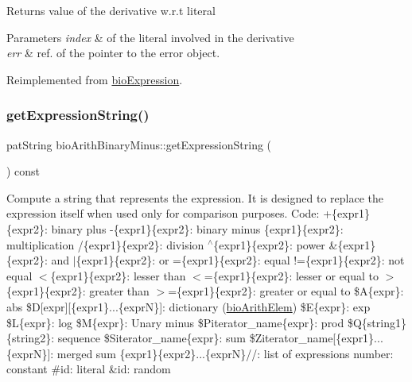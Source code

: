 \begin{DoxyReturn}{Returns}
value of the derivative w.\+r.\+t literal 
\end{DoxyReturn}

\begin{DoxyParams}{Parameters}
{\em index} & of the literal involved in the derivative \\
\hline
{\em err} & ref. of the pointer to the error object. \\
\hline
\end{DoxyParams}


Reimplemented from \hyperlink{classbio_expression_a5915579d1193f25f216c1e273c97f2ce}{bio\+Expression}.

\mbox{\label{classbio_arith_binary_minus_abfcff7ef3048216027a44af8af40471e}} 
\subsubsection{\texorpdfstring{get\+Expression\+String()}{getExpressionString()}}
{\footnotesize\ttfamily pat\+String bio\+Arith\+Binary\+Minus\+::get\+Expression\+String (\begin{DoxyParamCaption}{ }\end{DoxyParamCaption}) const\hspace{0.3cm}{\ttfamily [virtual]}}

Compute a string that represents the expression. It is designed to replace the expression itself when used only for comparison purposes. Code\+: +\{expr1\}\{expr2\}\+: binary plus -\/\{expr1\}\{expr2\}\+: binary minus \{expr1\}\{expr2\}\+: multiplication /\{expr1\}\{expr2\}\+: division $^\wedge$\{expr1\}\{expr2\}\+: power \&\{expr1\}\{expr2\}\+: and $\vert$\{expr1\}\{expr2\}\+: or =\{expr1\}\{expr2\}\+: equal !=\{expr1\}\{expr2\}\+: not equal $<$\{expr1\}\{expr2\}\+: lesser than $<$=\{expr1\}\{expr2\}\+: lesser or equal to $>$\{expr1\}\{expr2\}\+: greater than $>$=\{expr1\}\{expr2\}\+: greater or equal to \$A\{expr\}\+: abs \$D\mbox{[}expr\mbox{]}\mbox{[}\{expr1\}...\{exprN\}\mbox{]}\+: dictionary (\hyperlink{classbio_arith_elem}{bio\+Arith\+Elem}) \$E\{expr\}\+: exp \$L\{expr\}\+: log \$M\{expr\}\+: Unary minus \$\+Piterator\+\_\+name\{expr\}\+: prod \$Q\{string1\}\{string2\}\+: sequence \$\+Siterator\+\_\+name\{expr\}\+: sum \$\+Ziterator\+\_\+name\mbox{[}\{expr1\}...\{exprN\}\mbox{]}\+: merged sum \{expr1\}\{expr2\}...\{exprN\}//\+: list of expressions number\+: constant \#id\+: literal \&id\+: random 

